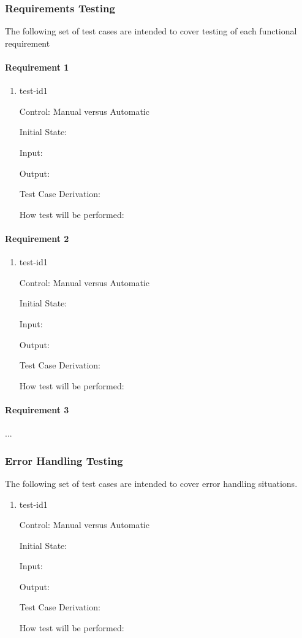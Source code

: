 \documentclass[12pt, titlepage]{article}
\begin{document}
\subsubsection{Requirements Testing}
The following set of test cases are intended to cover testing of each functional requirement 
\paragraph{Requirement 1}
\begin{enumerate}
\item{test-id1\\}

Control: Manual versus Automatic
					
Initial State: 
					
Input: 
					
Output: 

Test Case Derivation: 
					
How test will be performed: 
\end{enumerate}
\paragraph{Requirement 2}
\begin{enumerate}
\item{test-id1\\}

Control: Manual versus Automatic
					
Initial State: 
					
Input: 
					
Output: 

Test Case Derivation: 
					
How test will be performed: 
\end{enumerate}
\paragraph{Requirement 3}
...
\subsubsection{ Error Handling Testing}
The following set of test cases are intended to cover error handling situations. 
\begin{enumerate}
\item{test-id1\\}

Control: Manual versus Automatic
					
Initial State: 
					
Input: 
					
Output: 

Test Case Derivation: 
					
How test will be performed: 
\end{enumerate}
\end{document}
